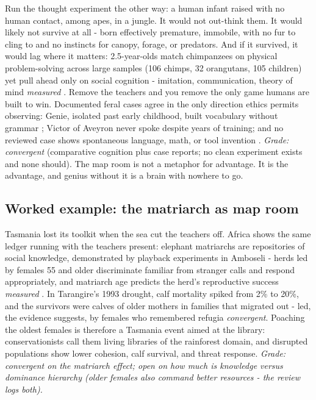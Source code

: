 Run the thought experiment the other way: a human infant raised with no human contact, among apes, in a jungle. It would not out-think them. It would likely not survive at all - born effectively premature, immobile, with no fur to cling to and no instincts for canopy, forage, or predators. And if it survived, it would lag where it matters: 2.5-year-olds match chimpanzees on physical problem-solving across large samples (106 chimps, 32 orangutans, 105 children) yet pull ahead only on social cognition - imitation, communication, theory of mind \textit{measured} \citep{herrmann2007}. Remove the teachers and you remove the only game humans are built to win. Documented feral cases agree in the only direction ethics permits observing: Genie, isolated past early childhood, built vocabulary without grammar \citep{curtiss1974}; Victor of Aveyron never spoke despite years of training; and no reviewed case shows spontaneous language, math, or tool invention \citep{mcneil1984}. \textit{Grade: convergent} (comparative cognition plus case reports; no clean experiment exists and none should). The map room is not a metaphor for advantage. It is the advantage, and genius without it is a brain with nowhere to go.

\subsection*{Worked example: the matriarch as map room}

Tasmania lost its toolkit when the sea cut the teachers off. Africa shows the same ledger running with the teachers present: elephant matriarchs are repositories of social knowledge, demonstrated by playback experiments in Amboseli - herds led by females 55 and older discriminate familiar from stranger calls and respond appropriately, and matriarch age predicts the herd's reproductive success \textit{measured} \citep{mccomb2001}. In Tarangire's 1993 drought, calf mortality spiked from 2\% to 20\%, and the survivors were calves of older mothers in families that migrated out - led, the evidence suggests, by females who remembered refugia \textit{convergent}. Poaching the oldest females is therefore a Tasmania event aimed at the library: conservationists call them living libraries of the rainforest domain, and disrupted populations show lower cohesion, calf survival, and threat response. \textit{Grade: convergent on the matriarch effect; open on how much is knowledge versus dominance hierarchy (older females also command better resources - the review logs both).}

